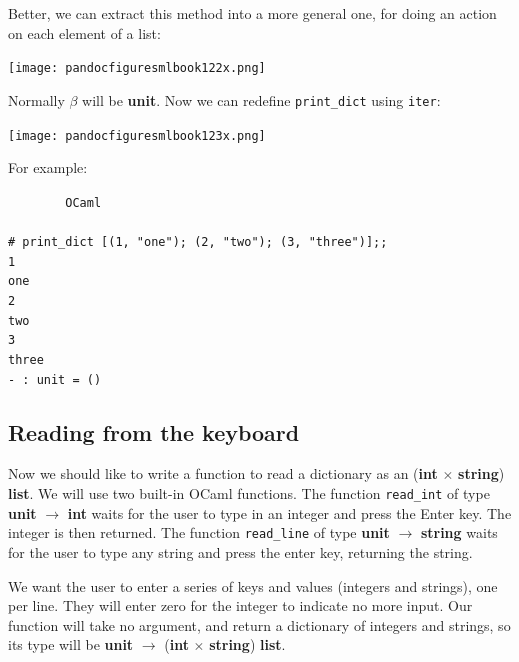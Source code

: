 \documentclass[]{book}
\newcommand{\smspace}{\vspace{4mm}}
\begin{document}
\noindent Better, we can extract this method into a more general one, for doing an action on each element of a list:

\medskip
\begin{center}
\noindent\texttt{[image: pandocfiguresmlbook122x.png]}
\end{center}
\medskip

\noindent Normally $\beta$ will be \textsf{\textbf{unit}}. Now we can redefine \texttt{print\_dict} using \texttt{iter}:

\medskip
\begin{center}
\noindent\texttt{[image: pandocfiguresmlbook123x.png]}
\end{center}
\medskip

\noindent For example:

\smspace
\noindent\verb!        OCaml!\\
\noindent\\
\noindent\verb!# print_dict [(1, "one"); (2, "two"); (3, "three")];;!\\
\noindent\verb!1!\\
\noindent\verb!one!\\
\noindent\verb!2!\\
\noindent\verb!two!\\
\noindent\verb!3!\\
\noindent\verb!three!\\
\noindent\verb!- : unit = ()!

\subsection*{Reading from the keyboard}
Now we should like to write a function to read a dictionary as an \textsf{\textmd{(}\textbf{int} $\times$ \textbf{string}\textmd{)} \textbf{list}}. We will use two built-in OCaml functions. The function \texttt{read\_int} of type \textsf{\textbf{unit} $\rightarrow$ \textbf{int}} waits for the user to type in an integer and press the Enter key. The integer is then returned. The function \texttt{read\_line} of type \textsf{\textbf{unit} $\rightarrow$ \textbf{string}} waits for the user to type any string and press the enter key, returning the string.

We want the user to enter a series of keys and values (integers and strings), one per line. They will enter zero for the integer to indicate no more input. Our function will take no argument, and return a dictionary of integers and strings, so its type will be \textsf{\textbf{unit} $\rightarrow$ \textmd{(}\textbf{int} $\times$ \textbf{string}\textmd{)} \textbf{list}}.
\end{document}
